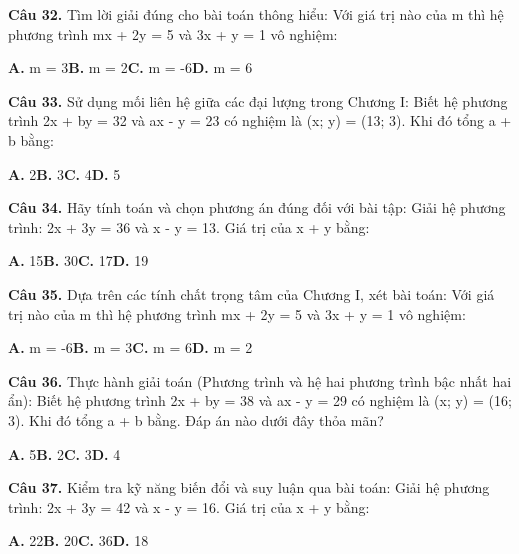 \documentclass[11pt,a4paper]{article}
\begin{document}
\textbf{\color{primary} Câu 32.} Tìm lời giải đúng cho bài toán thông hiểu: Với giá trị nào của m thì hệ phương trình mx + 2y = 5 và 3x + y = 1 vô nghiệm:\par
\hspace*{1.5em}\textbf{A.} m = 3\quad\quad \textbf{B.} m = 2\quad\quad \textbf{C.} m = -6\quad\quad \textbf{D.} m = 6\par\vspace{2pt}
\textbf{\color{primary} Câu 33.} Sử dụng mối liên hệ giữa các đại lượng trong Chương I: Biết hệ phương trình 2x + by = 32 và ax - y = 23 có nghiệm là (x; y) = (13; 3). Khi đó tổng a + b bằng:\par
\hspace*{1.5em}\textbf{A.} 2\quad\quad \textbf{B.} 3\quad\quad \textbf{C.} 4\quad\quad \textbf{D.} 5\par\vspace{2pt}
\textbf{\color{primary} Câu 34.} Hãy tính toán và chọn phương án đúng đối với bài tập: Giải hệ phương trình: 2x + 3y = 36 và x - y = 13. Giá trị của x + y bằng:\par
\hspace*{1.5em}\textbf{A.} 15\quad\quad \textbf{B.} 30\quad\quad \textbf{C.} 17\quad\quad \textbf{D.} 19\par\vspace{2pt}
\textbf{\color{primary} Câu 35.} Dựa trên các tính chất trọng tâm của Chương I, xét bài toán: Với giá trị nào của m thì hệ phương trình mx + 2y = 5 và 3x + y = 1 vô nghiệm:\par
\hspace*{1.5em}\textbf{A.} m = -6\quad\quad \textbf{B.} m = 3\quad\quad \textbf{C.} m = 6\quad\quad \textbf{D.} m = 2\par\vspace{2pt}
\textbf{\color{primary} Câu 36.} Thực hành giải toán (Phương trình và hệ hai phương trình bậc nhất hai ẩn): Biết hệ phương trình 2x + by = 38 và ax - y = 29 có nghiệm là (x; y) = (16; 3). Khi đó tổng a + b bằng. Đáp án nào dưới đây thỏa mãn?\par
\hspace*{1.5em}\textbf{A.} 5\quad\quad \textbf{B.} 2\quad\quad \textbf{C.} 3\quad\quad \textbf{D.} 4\par\vspace{2pt}
\textbf{\color{primary} Câu 37.} Kiểm tra kỹ năng biến đổi và suy luận qua bài toán: Giải hệ phương trình: 2x + 3y = 42 và x - y = 16. Giá trị của x + y bằng:\par
\hspace*{1.5em}\textbf{A.} 22\quad\quad \textbf{B.} 20\quad\quad \textbf{C.} 36\quad\quad \textbf{D.} 18\par\vspace{2pt}
\end{document}
